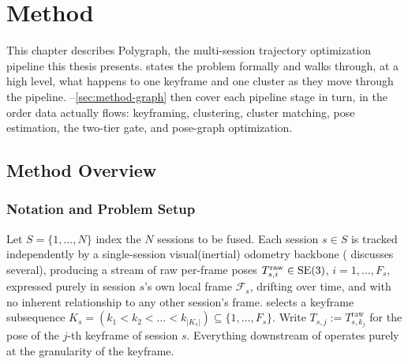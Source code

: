 %
\chapter{Method}
\label{chap:method}

This chapter describes Polygraph, the multi-session trajectory optimization pipeline this thesis
presents.  states the problem formally and walks through, at a
high level, what happens to one keyframe and one cluster as they move through the pipeline.
--\ref{sec:method-graph} then cover each pipeline stage in turn,
in the order data actually flows: keyframing, clustering, cluster matching, pose estimation,
the two-tier gate, and pose-graph optimization.

\section{Method Overview}
\label{sec:method-overview}
\subsection{Notation and Problem Setup}

Let $S = \{1, \dots, N\}$ index the $N$ sessions to be fused. Each session $s \in S$ is
tracked independently by a single-session visual(inertial) odometry backbone
( discusses several), producing a stream of raw per-frame poses
$T^{\mathrm{raw}}_{s,i} \in \mathrm{SE}(3)$, $i = 1, \dots, F_s$, expressed purely in session $s$'s own
local frame $\mathcal{F}_s$, drifting over time, and with no inherent relationship to any
other session's frame.  selects a keyframe subsequence
$K_s = (k_1 < k_2 < \dots < k_{|K_s|}) \subseteq \{1,\dots,F_s\}$. Write $T_{s,j} :=
T^{\mathrm{raw}}_{s,k_j}$ for the pose of the $j$-th keyframe of session $s$. Everything downstream of
 operates purely at the granularity of the keyframe.

